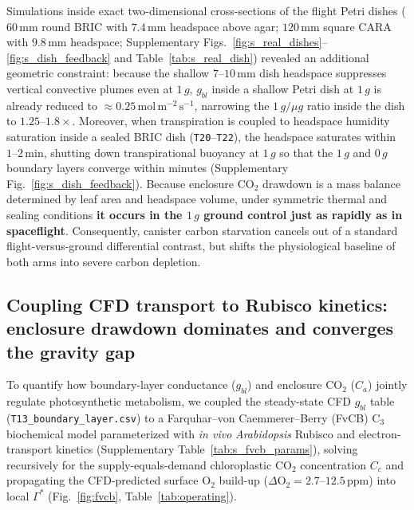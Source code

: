 \documentclass[preprint,11pt,numbers,sort&compress]{elsarticle}
\newcommand{\molms}{\ensuremath{\mathrm{mol\,m^{-2}\,s^{-1}}}}
\begin{document}
Simulations inside exact two-dimensional cross-sections of the flight Petri dishes ($60\,\mathrm{mm}$ round BRIC with $7.4\,\mathrm{mm}$ headspace above agar; $120\,\mathrm{mm}$ square CARA with $9.8\,\mathrm{mm}$ headspace; Supplementary Figs.~\ref{fig:s_real_dishes}--\ref{fig:s_dish_feedback} and Table~\ref{tab:s_real_dish}) revealed an additional geometric constraint: because the shallow $7\text{--}10\,\mathrm{mm}$ dish headspace suppresses vertical convective plumes even at $1\,g$, $g_{bl}$ inside a shallow Petri dish at $1\,g$ is already reduced to $\approx 0.25\,\molms$, narrowing the $1\,g/\mu g$ ratio inside the dish to $1.25\text{--}1.8\times$. Moreover, when transpiration is coupled to headspace humidity saturation inside a sealed BRIC dish (\texttt{T20}--\texttt{T22}), the headspace saturates within $1\text{--}2\,\mathrm{min}$, shutting down transpirational buoyancy at $1\,g$ so that the $1\,g$ and $0\,g$ boundary layers converge within minutes (Supplementary Fig.~\ref{fig:s_dish_feedback}). Because enclosure $\mathrm{CO_2}$ drawdown is a mass balance determined by leaf area and headspace volume, under symmetric thermal and sealing conditions \textbf{it occurs in the $1\,g$ ground control just as rapidly as in spaceflight}. Consequently, canister carbon starvation cancels out of a standard flight-versus-ground differential contrast, but shifts the physiological baseline of both arms into severe carbon depletion.

\subsection{Coupling CFD transport to Rubisco kinetics: enclosure drawdown dominates and converges the gravity gap}\label{sec:fvcb}

To quantify how boundary-layer conductance ($g_{bl}$) and enclosure $\mathrm{CO_2}$ ($C_a$) jointly regulate photosynthetic metabolism, we coupled the steady-state CFD $g_{bl}$ table (\texttt{T13\_boundary\_layer.csv}) to a Farquhar--von Caemmerer--Berry (FvCB) $\mathrm{C_3}$ biochemical model \citep{farquhar1980} parameterized with \textit{in vivo} \textit{Arabidopsis} Rubisco and electron-transport kinetics \citep{bernacchi2001,bernacchi2003} (Supplementary Table~\ref{tab:s_fvcb_params}), solving recursively for the supply-equals-demand chloroplastic $\mathrm{CO_2}$ concentration $C_c$ and propagating the CFD-predicted surface $\mathrm{O_2}$ build-up ($\Delta\mathrm{O_2} = 2.7\text{--}12.5\,\mathrm{ppm}$) into local $\Gamma^*$ (Fig.~\ref{fig:fvcb}, Table~\ref{tab:operating}).
\end{document}
